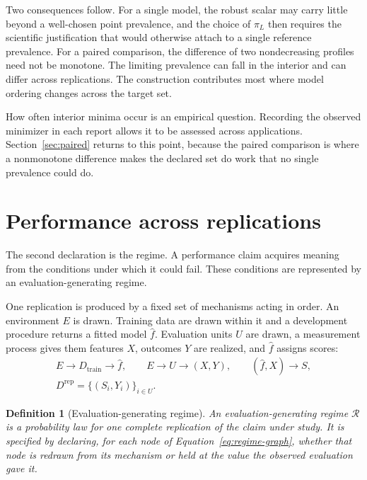 \documentclass[11pt]{article}
\newcommand{\Regime}{\mathcal{R}}
\newtheorem{definition}{Definition}
\theoremstyle{remark}
\begin{document}
Two consequences follow. For a single model, the robust scalar may carry little beyond a well-chosen point prevalence, and the choice of $\pi_L$ then requires the scientific justification that would otherwise attach to a single reference prevalence. For a paired comparison, the difference of two nondecreasing profiles need not be monotone. The limiting prevalence can fall in the interior and can differ across replications. The construction contributes most where model ordering changes across the target set.

How often interior minima occur is an empirical question. Recording the observed minimizer in each report allows it to be assessed across applications. Section~\ref{sec:paired} returns to this point, because the paired comparison is where a nonmonotone difference makes the declared set do work that no single prevalence could do.

\section{Performance across replications}
\label{sec:regime}

The second declaration is the regime. A performance claim acquires meaning from the conditions under which it could fail. These conditions are represented by an evaluation-generating regime.

One replication is produced by a fixed set of mechanisms acting in order. An environment $E$ is drawn. Training data are drawn within it and a development procedure returns a fitted model $\widehat f$. Evaluation units $U$ are drawn, a measurement process gives them features $X$, outcomes $Y$ are realized, and $\widehat f$ assigns scores:
\begin{equation}
\begin{gathered}
E\longrightarrow D_{\mathrm{train}}\longrightarrow\widehat f,
\qquad
E\longrightarrow U\longrightarrow(X,Y),
\qquad
(\widehat f,X)\longrightarrow S,
\\
D^{\mathrm{rep}}=\{(S_i,Y_i)\}_{i\in U}.
\end{gathered}
\label{eq:regime-graph}
\end{equation}

\begin{definition}[Evaluation-generating regime]
An evaluation-generating regime $\Regime$ is a probability law for one complete replication of the claim under study. It is specified by declaring, for each node of Equation~\eqref{eq:regime-graph}, whether that node is redrawn from its mechanism or held at the value the observed evaluation gave it.
\end{definition}
\end{document}
